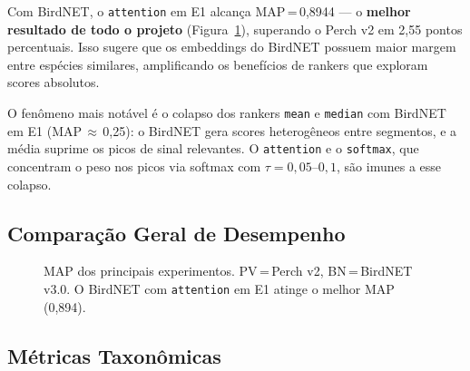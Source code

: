 \documentclass[12pt]{article}
\begin{document}
Com BirdNET, o \texttt{attention} em E1 alcança MAP\,=\,0,8944 --- o
\textbf{melhor resultado de todo o projeto} (Figura~\ref{fig:map_bars}),
superando o Perch v2 em 2,55 pontos percentuais. Isso sugere que os embeddings
do BirdNET possuem maior margem entre espécies similares, amplificando os
benefícios de rankers que exploram scores absolutos.

O fenômeno mais notável é o colapso dos rankers \texttt{mean} e \texttt{median}
com BirdNET em E1 (MAP\,$\approx$\,0,25): o BirdNET gera scores heterogêneos
entre segmentos, e a média suprime os picos de sinal relevantes. O
\texttt{attention} e o \texttt{softmax}, que concentram o peso nos picos via
softmax com $\tau=0{,}05$--$0{,}1$, são imunes a esse colapso.

\subsection{Comparação Geral de Desempenho}

\begin{figure}[H]
\centering
{}
\caption{MAP dos principais experimentos. PV\,=\,Perch v2,
BN\,=\,BirdNET v3.0. O BirdNET com \texttt{attention} em E1 atinge o melhor
MAP (0,894).}
\label{fig:map_bars}
\end{figure}

\subsection{Métricas Taxonômicas}
\end{document}
